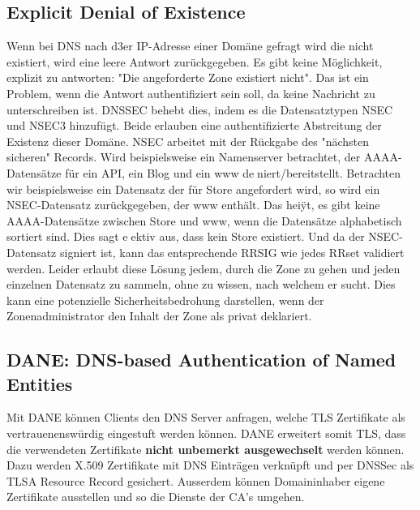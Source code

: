 \clearpage

\subsection{Explicit Denial of Existence}
Wenn bei DNS nach d3er IP-Adresse einer Domäne gefragt wird die nicht existiert, wird eine leere Antwort zurückgegeben. Es gibt keine Möglichkeit, explizit zu antworten: "Die angeforderte Zone existiert nicht". Das ist ein Problem, wenn die Antwort authentifiziert sein soll, da keine Nachricht zu unterschreiben ist. DNSSEC behebt dies, indem es die Datensatztypen NSEC und NSEC3 hinzufügt. Beide erlauben eine authentifizierte Abstreitung der Existenz dieser Domäne. NSEC arbeitet mit der Rückgabe des "nächsten sicheren" Records. Wird beispielsweise ein Namenserver betrachtet, der AAAA-Datensätze für ein API, ein Blog und ein www deniert/bereitstellt. Betrachten wir beispielsweise ein Datensatz der für Store angefordert wird, so wird ein NSEC-Datensatz zurückgegeben, der www enthält. Das heiÿt, es gibt keine AAAA-Datensätze zwischen Store und www, wenn die Datensätze alphabetisch sortiert sind. Dies sagt eektiv aus, dass kein Store existiert. Und da der NSEC-Datensatz signiert ist, kann das entsprechende RRSIG wie jedes RRset validiert werden. Leider erlaubt diese Lösung jedem, durch die Zone zu gehen und jeden einzelnen Datensatz zu sammeln, ohne zu wissen, nach welchem er sucht. Dies kann eine potenzielle Sicherheitsbedrohung darstellen, wenn der Zonenadministrator den Inhalt der Zone als privat deklariert.

\subsection{DANE: DNS-based Authentication of Named Entities}
Mit DANE können Clients den DNS Server anfragen, welche TLS Zertifikate als vertrauenenswürdig eingestuft werden können. DANE erweitert somit TLS, dass die verwendeten Zertifikate \textbf{ nicht unbemerkt ausgewechselt} werden können. Dazu werden X.509 Zertifikate mit DNS Einträgen verknüpft und per DNSSec als TLSA Resource Record gesichert. Ausserdem können Domaininhaber eigene Zertifikate ausstellen und so die Dienste der CA's umgehen.

